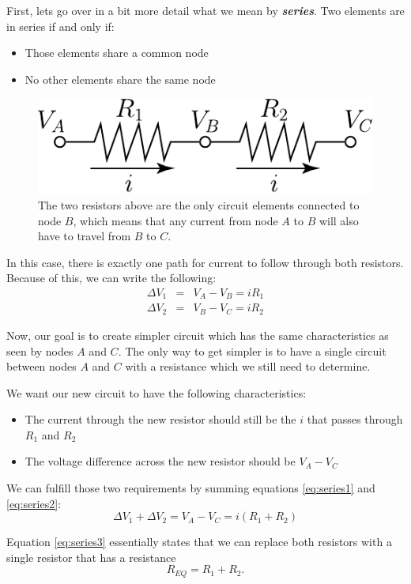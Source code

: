 First, lets go over in a bit more detail what we mean by {\it \bf series}. Two elements are in series if and only if:
\begin{itemize}
\item Those elements share a common node
\item No other elements share the same node
\end{itemize}

\begin{figure}
\centering
  \includegraphics{figures/resistorSeries}
  \caption{The two resistors above are the only circuit elements connected to node $B$, which means that any current from node $A$ to $B$ will also have to travel from $B$ to $C$.}
  \label{fig:resistorSeries}
\end{figure}


In this case, there is exactly one path for current to follow through both resistors.  Because of this, we can write the following:
\begin{eqnarray}
  \label{eq:series1} \Delta V_1 &=& V_A-V_B = i R_1 \\ 
  \label{eq:series2} \Delta V_2 &=& V_B-V_C = i R_2 
\end{eqnarray}

Now, our goal is to create simpler circuit which has the same characteristics as seen by nodes $A$ and $C$. The only way to get simpler is to have a single circuit between nodes $A$ and $C$ with a resistance which we still need to determine.

We want our new circuit to have the following characteristics:
\begin{itemize}
\item The current through the new resistor should still be the $i$ that passes through $R_1$ and $R_2$
\item The voltage difference across the new resistor should be $V_A - V_C$
\end{itemize}

We can fulfill those two requirements by summing equations \ref{eq:series1} and \ref{eq:series2}:
\begin{equation} \label{eq:series3}
\Delta V_1 + \Delta V_2 = V_A - V_C = i (R_1 + R_2)
\end{equation}

Equation \ref{eq:series3} essentially states that we can replace both resistors with a single resistor that has a resistance
\begin{equation} \label{eq:seriesEquivalent}
R_{EQ}=R_1+R_2.
\end{equation}
